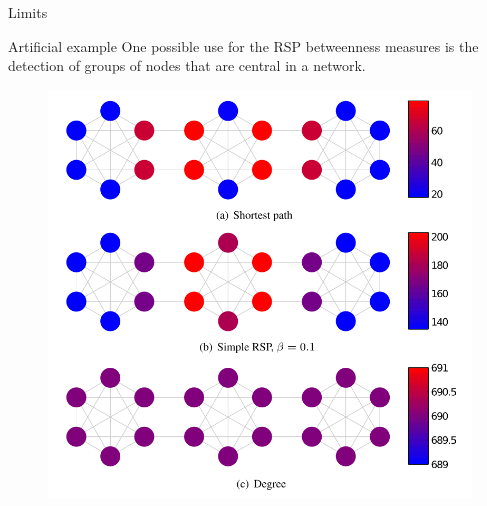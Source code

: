 \documentclass[13pt]{beamer}
\begin{document}
\begin{frame}[t,allowframebreaks]{Limits}
\begin{itemize}


    \end{itemize}

    \end{frame}

    \begin{frame}[t,allowframebreaks]{Artificial example}
    One possible use for the RSP betweenness measures is the detection of groups of nodes that are central in a network.



    \begin{figure}
    \includegraphics[height =0.6\paperheight]{Images/heat1.png}
    \end{figure}


\end{frame}
\end{document}
